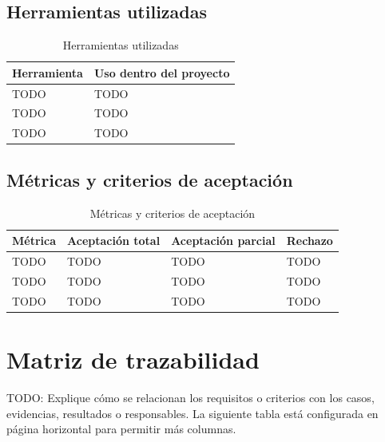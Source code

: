 \documentclass[11pt,spanish]{article}
\begin{document}
\subsection{Herramientas utilizadas}

\begin{table}[H]
\centering
\caption{Herramientas utilizadas}
\label{tab:herramientas}
\begin{tabularx}{\textwidth}{p{3.5cm} Y}
\toprule
\textbf{Herramienta} & \textbf{Uso dentro del proyecto} \\
\midrule
TODO & TODO \\
TODO & TODO \\
TODO & TODO \\
\bottomrule
\end{tabularx}
\end{table}

\subsection{Métricas y criterios de aceptación}

\begin{table}[H]
\centering
\caption{Métricas y criterios de aceptación}
\label{tab:metricas-aceptacion}
\begin{tabularx}{\textwidth}{p{4.1cm} p{3.2cm} p{3.2cm} Y}
\toprule
\textbf{Métrica} & \textbf{Aceptación total} & \textbf{Aceptación parcial} & \textbf{Rechazo} \\
\midrule
TODO & TODO & TODO & TODO \\
TODO & TODO & TODO & TODO \\
TODO & TODO & TODO & TODO \\
\bottomrule
\end{tabularx}
\end{table}

\section{Matriz de trazabilidad}

TODO: Explique cómo se relacionan los requisitos o criterios con los casos, evidencias, resultados o responsables. La siguiente tabla está configurada en página horizontal para permitir más columnas.
\end{document}
